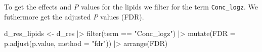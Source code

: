 \documentclass[
  letterpaper,
  DIV=11,
  numbers=noendperiod]{scrreprt}
\newenvironment{Shaded}{\begin{snugshade}}{\end{snugshade}}
\newcommand{\AttributeTok}[1]{\textcolor[rgb]{0.40,0.45,0.13}{#1}}
\newcommand{\FunctionTok}[1]{\textcolor[rgb]{0.28,0.35,0.67}{#1}}
\newcommand{\NormalTok}[1]{\textcolor[rgb]{0.00,0.23,0.31}{#1}}
\newcommand{\OtherTok}[1]{\textcolor[rgb]{0.00,0.23,0.31}{#1}}
\newcommand{\SpecialCharTok}[1]{\textcolor[rgb]{0.37,0.37,0.37}{#1}}
\newcommand{\StringTok}[1]{\textcolor[rgb]{0.13,0.47,0.30}{#1}}
\begin{document}
To get the effects and \emph{P} values for the lipids we filter for the
term \texttt{Conc\_logz}. We futhermore get the adjusted \emph{P} values
(FDR).

\begin{Shaded}
\begin{Highlighting}[]
\NormalTok{d\_res\_lipids }\OtherTok{\textless{}{-}}\NormalTok{ d\_res }\SpecialCharTok{|\textgreater{}} 
   \FunctionTok{filter}\NormalTok{(term }\SpecialCharTok{==} \StringTok{"Conc\_logz"}\NormalTok{) }\SpecialCharTok{|\textgreater{}} 
   \FunctionTok{mutate}\NormalTok{(}\AttributeTok{FDR =} \FunctionTok{p.adjust}\NormalTok{(p.value, }\AttributeTok{method =} \StringTok{"fdr"}\NormalTok{)) }\SpecialCharTok{|\textgreater{}} 
   \FunctionTok{arrange}\NormalTok{(FDR)}
\end{Highlighting}
\end{Shaded}
\end{document}
